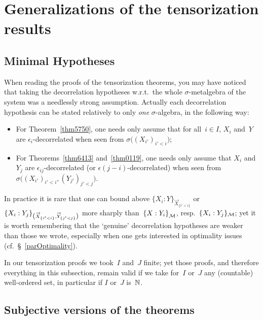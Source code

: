 \section{Generalizations of the tensorization results}

\subsection{Minimal Hypotheses}\label{parMinimalHypotheses}

When reading the proofs of the tensorization theorems,
you may have noticed that taking the decorrelation hypotheses
w.r.t.\ the whole $\sigma$-metalgebra of the system was a needlessly strong assumption.
Actually each decorrelation hypothesis can be stated
relatively to only \emph{one} $\sigma$-algebra,
in the following way:
%
\begin{itemize}
\item For Theorem~\ref{thm5750},
one needs only assume that for all~$i\in I$,
$X_i$ and~$Y$ are $\epsilon_i$-decorrelated
when seen from $\sigma\big((X_{i'})_{i'<i}\big)$;
%
\item For Theorems~\ref{thm6413} and~\ref{thm0119},
one needs only assume that
$X_i$ and~$Y_j$ are $\epsilon_{ij}$-decorrelated (or $\epsilon(j-i)$-decorrelated)
when seen from $\sigma\big((X_{i'})_{i'<i},(Y_{j'})_{j'<j}\big)$.
\end{itemize}

In practice it is rare that one can bound above
${\{X_i:Y\}_{\vec{X}_{\{i'<i\}}}}$
or~${\{X_i:Y_j\}_{\mathlarger{(}\vec{X}_{\{i'<i\}},\vec{Y}_{\{j'<j\}}\mathlarger{)}}}$
more sharply than~${\{X:Y_i\}}_{\mathcal{M}}$, resp.~${\{X_i:Y_j\}_{\mathcal{M}}}$;
yet it is worth remembering that the `genuine' decorrelation hypotheses
are weaker than those we wrote,
especially when one gets interested in optimality issues (cf.\ \S~\ref{parOptimality}).

\begin{Rmk}
In our tensorization proofs we took~$I$ and~$J$ finite; yet those proofs,
and therefore everything in this subsection,
remain valid if we take for~$I$ or~$J$ any (countable) well-ordered set,
in particular if $I$ or~$J$ is~$\mathbb{N}$.
\end{Rmk}


\subsection{Subjective versions of the theorems}\label{parSubjectiveResults}

